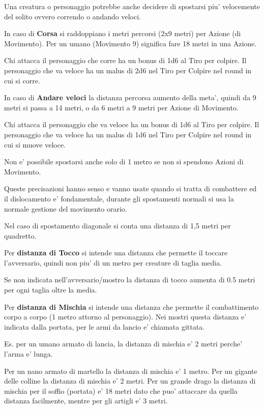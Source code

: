 \documentclass[a4paper,11pt,twoside,openany]{dndbook}
\begin{document}
Una creatura o personaggio potrebbe anche decidere di spostarsi piu' velocemente del solito ovvero correndo o andando veloci.

In caso di \textbf{Corsa} si raddoppiano i metri percorsi (2x9 metri) per Azione (di Movimento). Per un umano (Movimento 9) significa fare 18 metri in una Azione.

Chi attacca il personaggio che corre ha un bonus di 1d6 al Tiro per colpire. Il personaggio che va veloce ha un malus di 2d6 nel Tiro per Colpire nel round in cui si corre.

In caso di \textbf{Andare veloci} la distanza percorsa aumento della meta', quindi da 9 metri si passa a 14 metri, o da 6 metri a 9 metri per Azione di Movimento.

Chi attacca il personaggio che va veloce ha un bonus di 1d6 al Tiro per colpire. Il personaggio che va veloce ha un malus di 1d6 nel Tiro per Colpire nel round in cui si muove veloce.

Non e' possibile spostarsi anche solo di 1 metro se non si spendono Azioni di Movimento.

Queste precisazioni hanno senso e vanno usate quando si tratta di combattere ed il dislocamento e' fondamentale, durante gli spostamenti normali si usa la normale gestione del movimento orario.

Nel caso di spostamento diagonale si conta una distanza di 1,5 metri per quadretto.

Per \textbf{distanza di Tocco}  si intende una distanza che permette il toccare l'avversario, quindi non piu' di un metro per creature di taglia media.

Se non indicata nell'avversario/mostro la distanza di tocco aumenta di 0.5 metri per ogni taglia oltre la media.

Per \textbf{distanza di Mischia}  si intende una distanza che permette il combattimento corpo a corpo (1 metro attorno al personaggio). Nei mostri questa distanza e' indicata dalla portata, per le armi da lancio e' chiamata gittata.

Es. per un umano armato di lancia, la distanza di mischia e' 2 metri perche' l'arma e' lunga.

Per un nano armato di martello la distanza di mischia e' 1 metro. Per un gigante delle colline la distanza di mischia e' 2 metri. Per un grande drago la distanza di mischia per il soffio (portata) e' 18 metri dato che puo' attaccare da quella distanza facilmente, mentre per gli artigli e' 3 metri.
\end{document}
